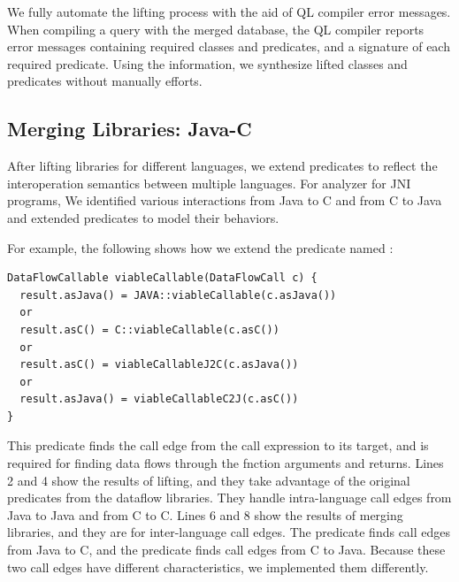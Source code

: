 We fully automate the lifting process with the aid of QL compiler error
messages. When compiling a query with the merged database, the QL compiler
reports error messages containing required classes and predicates, and a
signature of each required predicate. Using the information, we synthesize
lifted classes and predicates without manually efforts.


\subsection{Merging Libraries: Java-C}\label{sec:merging}
After lifting libraries for different languages, we extend predicates to
reflect the interoperation semantics between multiple languages.
For analyzer for JNI programs, We identified various interactions from Java to C and from C to Java
and extended predicates to model their behaviors.

For example, the following shows how we extend the predicate
named :
\begin{lstlisting}[style=codeql,xleftmargin=2.5em]
DataFlowCallable viableCallable(DataFlowCall c) {
  result.asJava() = JAVA::viableCallable(c.asJava())
  or
  result.asC() = C::viableCallable(c.asC())
  or
  result.asC() = viableCallableJ2C(c.asJava())
  or
  result.asJava() = viableCallableC2J(c.asC())
}
\end{lstlisting}
This predicate finds the call edge from the call expression to its
target, and is required for finding data flows through the fnction arguments and returns.
Lines 2 and 4 show the results of lifting, and they take advantage of the
original predicates from the dataflow libraries.  They handle
intra-language call edges from Java to Java and from C to C.
Lines 6 and 8 show the results of merging libraries, and they are
for inter-language call edges.  The predicate  finds call edges
from Java to C, and the predicate  finds call edges from
C to Java. Because these two call edges have different characteristics, we
implemented them differently.

